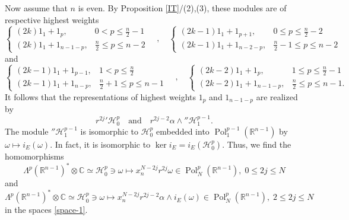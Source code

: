 \documentclass[a4paper,12pt,reqno]{amsart}
\numberwithin{theorem}{subsection}
\numberwithin{equation}{section}
\begin{document}
Now assume that $n$ is even. By Proposition \ref{IT}/(2),(3), these modules are
of respective highest weights
$$
   \begin{cases}
   (2k) 1_1 + 1_p, & 0 < p \le \frac{n}{2}-1 \\
   (2k) 1_1 + 1_{n-1-p}, & \frac{n}{2} \le p \le n-2
   \end{cases}
   \quad , \quad
   \begin{cases}
   (2k-1) 1_1 + 1_{p+1}, & 0 \le p \le \frac{n}{2}-2 \\
   (2k-1) 1_1 + 1_{n-2-p}, & \frac{n}{2}-1 \le p \le n-2
   \end{cases}
$$
and
$$
   \begin{cases}
   (2k-1) 1_1 + 1_{p-1}, & 1 < p \le \frac{n}{2} \\
   (2k-1) 1_1 + 1_{n-p}, & \frac{n}{2}+1 \le p \le n-1
   \end{cases}
   \quad , \quad
   \begin{cases}
   (2k-2) 1_1 + 1_p, & 1 \le p \le \frac{n}{2}-1 \\
   (2k-2) 1_1 + 1_{n-1-p}, & \frac{n}{2} \le p \le n-1.
   \end{cases}
$$
It follows that the representations of highest weights $1_p$ and $1_{n-1-p}$
are realized by
$$
   r^{2j} {'{\mathcal H}}_0^p \quad \mbox{and} \quad r^{2j-2} \alpha \wedge {''{\mathcal H}}_1^{p-1}.
$$
The module ${''{\mathcal H}}_1^{p-1}$ is isomorphic to ${\mathcal H}^p_0$ embedded into
${\operatorname{Pol}}_1^{p-1}({\mathbb{R}}^{n-1})$ by $\omega \mapsto i_E (\omega)$. In fact, it is
isomorphic to $\ker i_E = i_E ({\mathcal H}_0^p)$. Thus, we find the homomorphisms
\begin{equation}\label{type-1-pp1}
   \Lambda^p({\mathbb{R}}^{n-1})^* \otimes {\mathbb{C}} \simeq {\mathcal H}_0^p \ni \omega \mapsto x_n^{N-2j} r^{2j}
   \omega \in {\operatorname{Pol}}_N^p({\mathbb{R}}^{n-1}), \; 0 \le 2j \le N
\end{equation}
and
\begin{equation}\label{type-1-pp2}
   \Lambda^p({\mathbb{R}}^{n-1})^* \otimes {\mathbb{C}} \simeq {\mathcal H}_0^p \ni \omega
   \mapsto x_n^{N-2j} r^{2j-2} \alpha \wedge i_E (\omega) \in
   {\operatorname{Pol}}_N^p({\mathbb{R}}^{n-1}), \; 2 \le 2j \le N
\end{equation}
in the spaces \eqref{space-1}.
\end{document}
